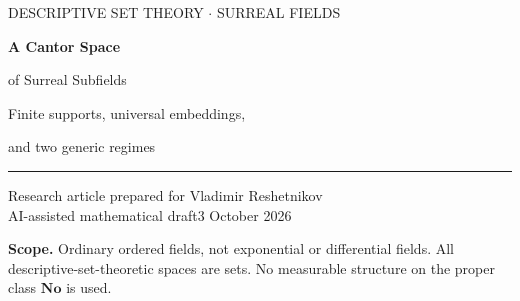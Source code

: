 \documentclass[11pt,a4paper]{article}
\numberwithin{equation}{section}
\theoremstyle{definition}
\theoremstyle{remark}
\newcommand{\Q}{\mathbb Q}
\newcommand{\No}{\mathbf{No}}
\newcommand{\Kstar}{K^{\star}}
\begin{document}
\hypersetup{pageanchor=false}
\begin{titlepage}
\vspace*{12mm}
{\color{MidnightBlue}\large\sffamily DESCRIPTIVE SET THEORY $\boldsymbol\cdot$ SURREAL FIELDS}\par
\vspace{12mm}
{\fontsize{27}{33}\selectfont\bfseries A Cantor Space\par of Surreal Subfields}\par
\vspace{7mm}
{\Large Finite supports, universal embeddings,\par and two generic regimes}\par
\vspace{10mm}
\noindent\rule{\textwidth}{0.6pt}
\vspace{5mm}
\noindent Research article prepared for Vladimir Reshetnikov\\
AI-assisted mathematical draft\hfill 3 October 2026
\vspace{11mm}
\begin{abstract}
We construct an explicit countable real-closed subfield $\Kstar$ of the surreal
numbers and a closed Cantor family of elementary subfields of $\Kstar$.
Every ambient element has a unique finite support in a fixed transcendence
basis. Consequently, varying a subfield is topologically as simple as choosing
a subset of a countable set. Nevertheless, field embeddability on this compact
family is a complete analytic quasiorder. A concrete coding uses
$\omega^{b\omega^q}$, with $q\in\Q$ and
$b\in\{1,\sqrt2,\sqrt3,\sqrt5,\ldots\}$; the ordered additive groups of real
quadratic fields intrinsically record countably many colors.

A rank-one subfamily admits an exact reduction to countable linear orders.
Within it, a fixed field of reverse-$\omega$ value-group rank has an
analytic-complete embedding locus, while every source of finite transcendence
degree has an open locus. Almost every rank-one parameter, both in category
and in coin-flip measure, gives the same isomorphism type. In the larger
family, by contrast, the locus admitting the whole ambient field is also analytic-complete
and dense, but meager and null. General category and measure zero--one laws explain
the two regimes.

The unrestricted complexity of countable real-closed-field embeddability is
already known. The contribution developed here is the explicit common
surreal ambient field, compact finite-support localization, fixed-source
threshold, and generic comparison. Full proofs of these refinements are
given; historical priority is not certified, and no Lean verification is
claimed.
\end{abstract}
\vfill
\noindent\small\textbf{Scope.} Ordinary ordered fields, not exponential or differential
fields. All descriptive-set-theoretic spaces are sets. No measurable
structure on the proper class $\No$ is used.


\end{titlepage}
\end{document}
